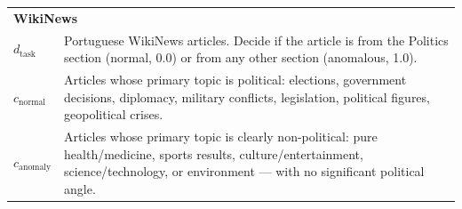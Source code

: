 \documentclass[12pt]{article}
\begin{document}
\begin{table}[ht]
\begin{tabularx}{\textwidth}{lX}
\midrule
\multicolumn{2}{l}{\textbf{WikiNews}} \\
$d_{\text{task}}$ & Portuguese WikiNews articles. Decide if the article is from the Politics section (normal, 0.0) or from any other section (anomalous, 1.0). \\
$c_{\text{normal}}$ & Articles whose primary topic is political: elections, government decisions, diplomacy, military conflicts, legislation, political figures, geopolitical crises. \\
$c_{\text{anomaly}}$ & Articles whose primary topic is clearly non-political: pure health/medicine, sports results, culture/entertainment, science/technology, or environment --- with no significant political angle. \\
\bottomrule
\end{tabularx}
\end{table}
\end{document}
